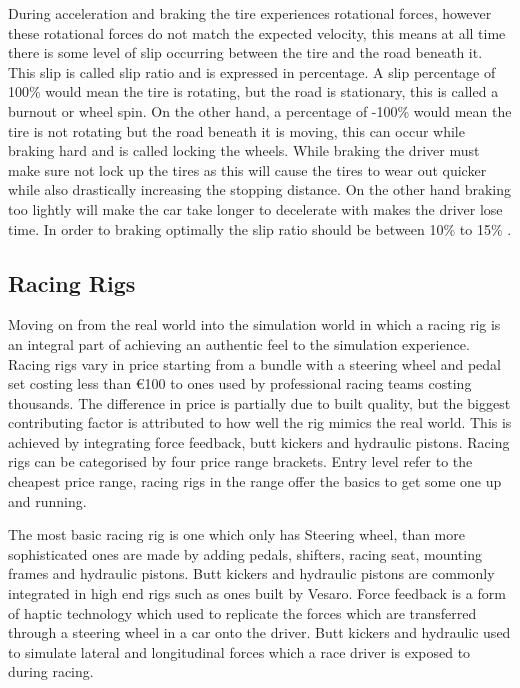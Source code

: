 During acceleration and braking the tire experiences rotational forces, however these rotational forces do not match the expected velocity, this means at all time there is some level of slip occurring between the tire and the road beneath it. This slip is called slip ratio and is expressed in percentage. A slip percentage of 100\% would mean the tire is rotating, but the road is stationary, this is called a burnout or wheel spin. On the other hand, a percentage of -100\% would mean the tire is not rotating but the road beneath it is moving, this can occur while braking hard and is called locking the wheels\cite{pacejka2006tire}. While braking the driver must make sure not lock up the tires as this will cause the tires to wear out quicker while also drastically increasing the stopping distance. On the other hand braking too lightly will make the car take longer to decelerate with makes the driver lose time. In order to braking optimally the slip ratio should be between 10\% to 15\% \cite{GoingFaster}.

\subsection{Racing Rigs}

Moving on from the real world into the simulation world in which a racing rig is an integral part of achieving an authentic feel to the simulation experience. Racing rigs vary in price starting from a bundle with a steering wheel and pedal set costing less than €100 to ones used by professional racing teams costing thousands. The difference in price is partially due to built quality, but the biggest contributing factor is attributed to how well the rig mimics the real world. This is achieved by integrating force feedback, butt kickers and hydraulic pistons. Racing rigs can be categorised by four price range brackets. Entry level refer to the cheapest price range, racing rigs in the range offer the basics to get some one up and running.

The most basic racing rig is one which only has Steering wheel, than more sophisticated ones are made by adding pedals, shifters, racing seat, mounting frames and hydraulic pistons. Butt kickers and hydraulic pistons are commonly integrated in high end rigs such as ones built by Vesaro. Force feedback is a form of haptic technology which used to replicate the forces which are transferred through a steering wheel in a car onto the driver\cite{li2015can}. Butt kickers and hydraulic used to simulate lateral and longitudinal forces which a race driver is exposed to during racing.

